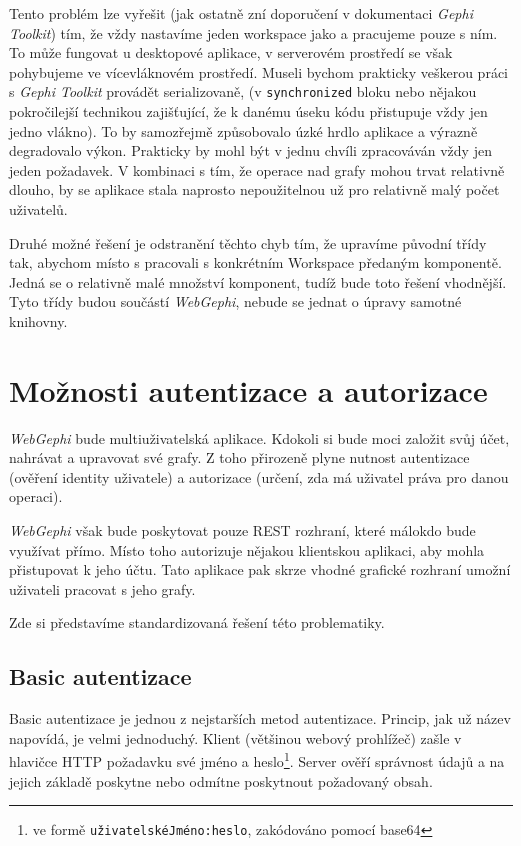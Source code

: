\documentclass[thesis=M,czech]{FITthesis}[2014/05/6]
\begin{document}
 Tento problém lze vyřešit (jak ostatně zní doporučení v dokumentaci \textit{Gephi Toolkit}) tím, že vždy nastavíme jeden workspace jako  a pracujeme pouze s ním.
 To může fungovat u desktopové aplikace, v serverovém prostředí se však pohybujeme ve vícevláknovém prostředí. Museli bychom prakticky veškerou práci s \textit{Gephi Toolkit}
 provádět serializovaně, (v \texttt{synchronized} bloku nebo nějakou pokročilejší technikou zajišťující, že k danému úseku kódu přistupuje vždy jen jedno vlákno). To
 by samozřejmě způsobovalo úzké hrdlo aplikace a výrazně degradovalo výkon. Prakticky by mohl být v jednu chvíli zpracováván vždy jen jeden požadavek.
 V kombinaci s tím, že operace nad grafy mohou trvat relativně dlouho, by se aplikace stala naprosto nepoužitelnou už pro relativně malý počet uživatelů.
 
 Druhé možné řešení je odstranění těchto chyb tím, že upravíme původní třídy tak, abychom místo s  pracovali s konkrétním Work\-space předaným komponentě.
 Jedná se o relativně malé množství komponent, tudíž bude toto řešení vhodnější. Tyto třídy budou součástí \textit{WebGephi}, nebude se jednat o úpravy samotné knihovny.
 
\section{Možnosti autentizace a autorizace}
\textit{WebGephi} bude multiuživatelská aplikace. Kdokoli si bude moci založit svůj účet, nahrávat a upravovat své grafy.
Z toho přirozeně plyne nutnost autentizace (ověření identity uživatele) a autorizace (určení, zda má uživatel práva pro danou operaci).

\textit{WebGephi} však bude poskytovat pouze REST rozhraní, které málokdo bude využívat přímo. Místo toho autorizuje nějakou klientskou aplikaci, aby
mohla přistupovat k jeho účtu. Tato aplikace pak skrze vhodné grafické rozhraní umožní uživateli pracovat s jeho grafy.

Zde si představíme standardizovaná řešení této problematiky.

\subsection{Basic autentizace\cite{wiki:basic}}
Basic autentizace je jednou z nejstarších metod autentizace. Princip, jak už název napovídá, je velmi jednoduchý. Klient (většinou webový prohlížeč) zašle
v hlavičce HTTP požadavku své jméno a heslo\footnote{ve formě \texttt{uživatelskéJméno:heslo}, zakódováno pomocí base64}. Server ověří správnost údajů a na jejich základě poskytne nebo
odmítne poskytnout požadovaný obsah.
\end{document}
